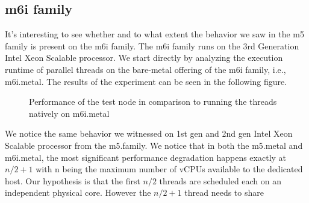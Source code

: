 \subsection{m6i family}
It's interesting to see whether and to what extent the behavior we saw in the m5 family is present on 
the m6i family. The m6i family runs on the 3rd Generation Intel Xeon Scalable processor. We start 
directly by analyzing the execution runtime of parallel threads on the bare-metal offering of the m6i 
family, i.e., m6i.metal. The results of the experiment can be seen in the following figure. 
\begin{figure}[H]
\caption{Performance of the test node in comparison to running the threads natively on m6i.metal}
\end{figure}
\noindent
We notice the same behavior we witnessed on 1st gen and 2nd gen Intel Xeon Scalable processor from the 
m5.family. We notice that in both the m5.metal and m6i.metal, the most significant performance degradation 
happens exactly at    \begin{math}n / 2 + 1\end{math} with n being the maximum number of vCPUs available 
to the dedicated host. Our hypothesis is that the first \begin{math}n/2\end{math} threads are scheduled 
each on an independent physical core. However the \begin{math}n / 2 + 1\end{math} thread needs to share 

